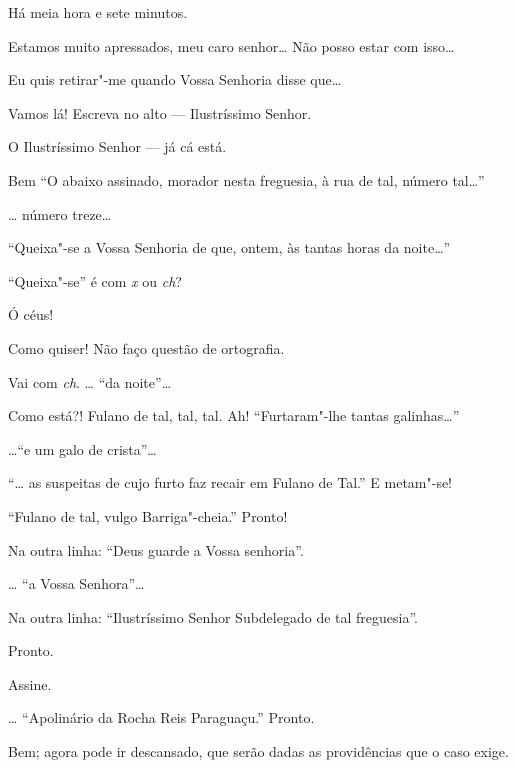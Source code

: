 \begin{linenumbers}
  Há meia hora e sete minutos.

 Estamos muito apressados, meu caro senhor\ldots{} Não posso estar
com isso\ldots{}

 Eu quis retirar"-me quando Vossa Senhoria disse que\ldots{}

 Vamos lá! Escreva no alto --- Ilustríssimo Senhor.

 O Ilustríssimo Senhor --- já cá está.

 Bem  “O abaixo assinado, morador nesta
freguesia, à rua de tal, número tal\ldots{}”

  \ldots{} número treze\ldots{}

 “Queixa"-se a Vossa Senhoria de que, ontem, às tantas horas da
noite\ldots{}”

 “Queixa"-se” é com \textit{x} ou \textit{ch}?

 Ó céus! 

 Como quiser! Não faço questão de ortografia.

 Vai com \textit{ch}. \ldots{} “da noite”\ldots{}

 Como está?!  Fulano de tal, tal, tal. Ah!
 “Furtaram"-lhe tantas galinhas\ldots{}”

  \ldots{}``e um galo de crista”\ldots{}

 “\ldots{} as suspeitas de cujo furto faz recair em Fulano de Tal.”
 E metam"-se!

  “Fulano de tal, vulgo
Barriga"-cheia.” Pronto!

 Na outra linha: “Deus guarde a Vossa senhoria”.

 \ldots{} “a Vossa Senhora”\ldots{}

 Na outra linha: “Ilustríssimo Senhor Subdelegado de tal
freguesia”.

 Pronto.

 Assine.

 \ldots{} “Apolinário da Rocha Reis Paraguaçu.”
 Pronto.

 Bem; agora pode ir descansado, que serão dadas as providências
que o caso exige.


\end{linenumbers}
